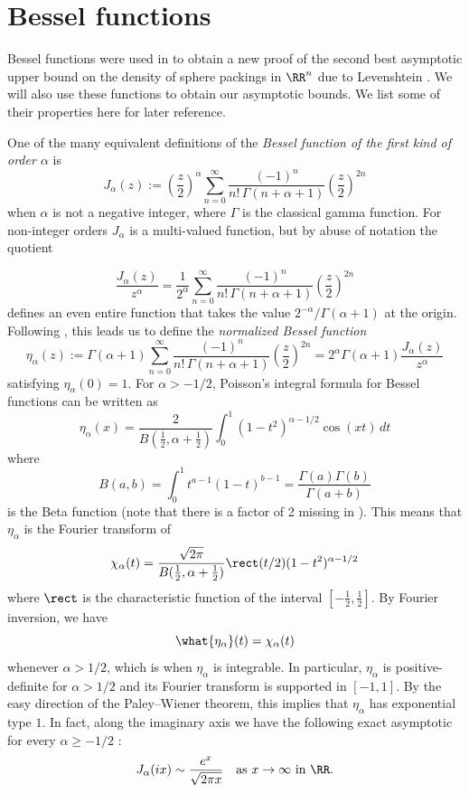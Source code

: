 \documentclass[12pt]{amsart}
\numberwithin{equation}{section}
\begin{document}
\section{Bessel functions} \label{sec:Bessel}

Bessel functions were used in \cite{CohnElkies} to obtain a new proof of the second best asymptotic upper bound on the density of sphere packings in $\RR^n$ due to Levenshtein \cite{Lev}. We will also use these functions to obtain our asymptotic bounds. We list some of their properties here for later reference.

One of the many equivalent definitions \cite[p.40]{Watson} of the \emph{Bessel function of the first kind of order $\alpha$} is
\[
J_\alpha(z) := \left( \frac{z}{2}\right)^{\alpha}\sum_{n=0}^\infty \frac{(-1)^n}{n!\, \Gamma(n+\alpha+1)} \left( \frac{z}{2}\right)^{2n}
\]
when $\alpha$ is not a negative integer, where $\Gamma$ is the classical gamma function. For non-integer orders $J_\alpha$ is a multi-valued function, but by abuse of notation the quotient

\[
\frac{J_\alpha(z)}{z^\alpha} = \frac{1}{2^\alpha} \sum_{n=0}^\infty \frac{(-1)^n}{n!\, \Gamma(n+\alpha+1)} \left( \frac{z}{2}\right)^{2n}
\]
defines an even entire function that takes the value $2^{-\alpha}/\Gamma(\alpha+1)$ at the origin. Following \cite{Gorbachev}, this leads us to define the \emph{normalized Bessel function}
\[
\eta_\alpha(z) := \Gamma(\alpha+1) \sum_{n=0}^\infty \frac{(-1)^n}{n!\, \Gamma(n+\alpha+1)} \left(\frac{z}{2}\right)^{2n} = 2^\alpha \Gamma(\alpha+1) \frac{J_\alpha(z)}{z^\alpha}
\]
satisfying $\eta_\alpha(0)=1$. For $\alpha > -1/2$, Poisson's integral formula for Bessel functions \cite[p.224, eq. (10.9.4)]{NIST} can be written as
\[
\eta_\alpha(x) = \frac{2}{B(\frac12,\alpha+\frac12)} \int_0^1 (1-t^2)^{\alpha-1/2} \cos(xt)\,dt
\]
where
\[
B(a,b) = \int_0^1 t^{a-1}(1-t)^{b-1} = \frac{\Gamma(a)\Gamma(b)}{\Gamma(a+b)}
\]
is the Beta function (note that there is a factor of 2 missing in \cite[eq. (2.8)]{Gorbachev}). This means that $\eta_\alpha$ is the Fourier transform of 
\[
\chi_\alpha(t) =  \frac{\sqrt{2\pi}}{B(\frac12,\alpha+\frac12)} \rect(t/2) (1-t^2)^{\alpha - 1/2}
\]
where $\rect$ is the characteristic function of the interval $\left[-\frac12,\frac12\right]$. By Fourier inversion, we have
\[
\what{\eta_\alpha}(t) =  \chi_\alpha(t)
\]
whenever $\alpha>1/2$, which is when $\eta_\alpha$ is integrable. In particular, $\eta_\alpha$ is positive-definite for $\alpha > 1/2$ and its Fourier transform is supported in $[-1,1]$. By the easy direction of the Paley--Wiener theorem, this implies that $\eta_\alpha$ has exponential type $1$. In fact, along the imaginary axis we have the following exact asymptotic for every $\alpha \geq -1/2$ \cite[p.203]{Watson}:
\begin{equation} \label{eq:Bessel_assymptotic_imag}
J_\alpha(ix) \sim \frac{e^{x}}{\sqrt{2\pi x}} \quad \text{as }  x \to \infty \text{ in }\RR. 
\end{equation}
\end{document}
